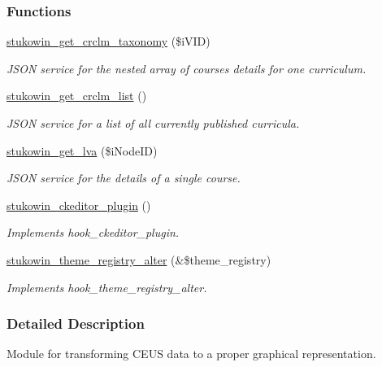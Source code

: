 \subsubsection*{Functions}
\begin{DoxyCompactItemize}
\item 
\hyperlink{group___drupal2_a_g_g_gaf137f10bef98707dacaf33d6581773d0}{stukowin\+\_\+get\+\_\+crclm\+\_\+taxonomy} (\$i\+V\+I\+D)
\begin{DoxyCompactList}\small\item\em J\+S\+O\+N service for the nested array of courses details for one curriculum. \end{DoxyCompactList}\item 
\hyperlink{group___drupal2_a_g_g_gad0cb4d7faa68097f5b7df8311e36b22e}{stukowin\+\_\+get\+\_\+crclm\+\_\+list} ()
\begin{DoxyCompactList}\small\item\em J\+S\+O\+N service for a list of all currently published curricula. \end{DoxyCompactList}\item 
\hyperlink{group___drupal2_a_g_g_ga7522e206f1a87971b916a7a0be0098c6}{stukowin\+\_\+get\+\_\+lva} (\$i\+Node\+I\+D)
\begin{DoxyCompactList}\small\item\em J\+S\+O\+N service for the details of a single course. \end{DoxyCompactList}\item 
\hyperlink{group___drupal2_a_g_g_gae3c906d1ab9c3d8ed245d58c1ebf2a4a}{stukowin\+\_\+ckeditor\+\_\+plugin} ()
\begin{DoxyCompactList}\small\item\em Implements hook\+\_\+ckeditor\+\_\+plugin. \end{DoxyCompactList}\item 
\hyperlink{group___drupal2_a_g_g_ga3bf2203298453c41bf9a5ec48d3c2de3}{stukowin\+\_\+theme\+\_\+registry\+\_\+alter} (\&\$theme\+\_\+registry)
\begin{DoxyCompactList}\small\item\em Implements hook\+\_\+theme\+\_\+registry\+\_\+alter. \end{DoxyCompactList}\end{DoxyCompactItemize}


\subsubsection{Detailed Description}
Module for transforming C\+E\+U\+S data to a proper graphical representation. 

